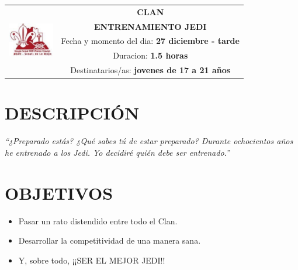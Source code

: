 \documentclass[72pt]{article}
\newlength{\w}
\begin{document}
\large
{}\selectfont
\begin{tabular}{|p{2cm}|c|}
\hline
\multirow{5}{*}{\includegraphics[width=2cm]{logo}} & \textbf{CLAN} \\ %
\cline{2-2}
& \textbf{ENTRENAMIENTO JEDI} \\ %
\cline{2-2}
& \parbox{\textwidth-4cm}{Fecha y momento del dia: \textbf{27 diciembre - tarde}} \\ %
& \parbox{\textwidth-4cm}{Duracion: \textbf{1.5 horas}} \\ %
& \parbox{\textwidth-4cm}{Destinatarios/as: \textbf{jovenes de 17 a 21 años}} \\ %
\hline
\end{tabular}

\section*{DESCRIPCI\'ON} 
\textit{“¿Preparado estás? ¿Qué sabes tú de estar preparado? Durante
ochocientos años he entrenado a los Jedi. Yo decidiré quién debe ser
entrenado.”}

\section*{OBJETIVOS}
\begin{itemize}
    \item Pasar un rato distendido entre todo el Clan.
    \item Desarrollar la competitividad de una manera sana.
    \item Y, sobre todo, ¡¡SER EL MEJOR JEDI!!
\end{itemize}
\end{document}
